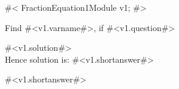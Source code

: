 

#<
FractionEquation1Module v1;
#>

Find #<v1.varname#>, if #<v1.question#>

#<v1.solution#>\\ [1.8mm]
Hence solution is: #<v1.shortanswer#> 

#<v1.shortanswer#>



